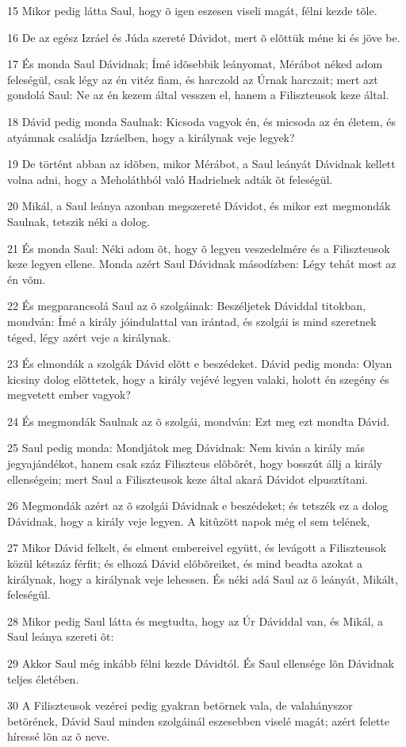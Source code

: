 \par 15 Mikor pedig látta Saul, hogy õ igen eszesen viseli magát, félni kezde tõle.
\par 16 De az egész Izráel és Júda szereté Dávidot, mert õ elõttük méne ki és jöve be.
\par 17 És monda Saul Dávidnak; Ímé idõsebbik leányomat, Mérábot néked adom feleségül, csak légy az én vitéz fiam, és harczold az Úrnak harczait; mert azt gondolá Saul: Ne az én kezem által vesszen el, hanem a Filiszteusok keze által.
\par 18 Dávid pedig monda Saulnak: Kicsoda vagyok én, és micsoda az én életem, és atyámnak családja Izráelben, hogy a királynak veje legyek?
\par 19 De történt abban az idõben, mikor Mérábot, a Saul leányát Dávidnak kellett volna adni, hogy a Meholáthból való Hadrielnek adták õt feleségül.
\par 20 Mikál, a Saul leánya azonban megszereté Dávidot, és mikor ezt megmondák Saulnak, tetszik néki a dolog.
\par 21 És monda Saul: Néki adom õt, hogy õ legyen veszedelmére és a Filiszteusok keze legyen ellene. Monda azért Saul Dávidnak másodízben: Légy tehát most az én võm.
\par 22 És megparancsolá Saul az õ szolgáinak: Beszéljetek Dáviddal titokban, mondván: Ímé a király jóindulattal van irántad, és szolgái is mind szeretnek téged, légy azért veje a királynak.
\par 23 És elmondák a szolgák Dávid elõtt e beszédeket. Dávid pedig monda: Olyan kicsiny dolog elõttetek, hogy a király vejévé legyen valaki, holott én szegény és megvetett ember vagyok?
\par 24 És megmondák Saulnak az õ szolgái, mondván: Ezt meg ezt mondta Dávid.
\par 25 Saul pedig monda: Mondjátok meg Dávidnak: Nem kiván a király más jegyajándékot, hanem csak száz Filiszteus elõbõrét, hogy bosszút állj a király ellenségein; mert Saul a Filiszteusok keze által akará Dávidot elpusztítani.
\par 26 Megmondák azért az õ szolgái Dávidnak e beszédeket; és tetszék ez a dolog Dávidnak, hogy a király veje legyen. A kitûzött napok még el sem telének,
\par 27 Mikor Dávid felkelt, és elment embereivel együtt, és levágott a Filiszteusok közül kétszáz férfit; és elhozá Dávid elõbõreiket, és mind beadta azokat a királynak, hogy a királynak veje lehessen. És néki adá Saul az õ leányát, Mikált, feleségül.
\par 28 Mikor pedig Saul látta és megtudta, hogy az Úr Dáviddal van, és Mikál, a Saul leánya szereti õt:
\par 29 Akkor Saul még inkább félni kezde Dávidtól. És Saul ellensége lõn Dávidnak teljes életében.
\par 30 A Filiszteusok vezérei pedig gyakran betörnek vala, de valahányszor betörének, Dávid Saul minden szolgáinál eszesebben viselé magát; azért felette híressé lõn az õ neve.

